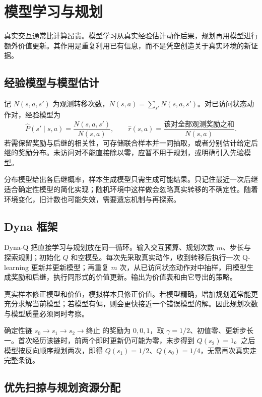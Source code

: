 \documentclass[UTF8,12pt,a4paper,fontset=fandol]{ctexbook}
\begin{document}
\chapter{模型学习与规划}
\label{ch:rl-planning}

真实交互通常比计算昂贵。模型学习从真实经验估计动作后果，规划再用模型进行额外价值更新。其作用是重复利用已有信息，而不是凭空创造关于真实环境的新证据。

\section{经验模型与模型估计}

记 $N(s,a,s')$ 为观测转移次数，$N(s,a)=\sum_{s'}N(s,a,s')$。对已访问状态动作对，经验模型为
\[
\widehat P(s'\mid s,a)=\frac{N(s,a,s')}{N(s,a)},\qquad
\widehat r(s,a)=\frac{\text{该对全部观测奖励之和}}{N(s,a)}.
\]
若需保留奖励与后继的相关性，可存储联合样本并一同抽取，或者分别估计给定后继的奖励分布。未访问对不能直接除以零，应暂不用于规划，或明确引入先验模型。

分布模型给出各后继概率，样本生成模型只需生成可能结果。只记住最近一次后继适合确定性模型的简化实现；随机环境中这样做会忽略真实转移的不确定性。随着环境变化，旧计数也可能失效，需要遗忘机制与再探索。

\section{Dyna 框架}

Dyna-Q 把直接学习与规划放在同一循环。输入交互预算、规划次数 $m$、步长与探索规则；初始化 $Q$ 和空模型。每次先采取真实动作，收到转移后执行一次 Q-learning 更新并更新模型；再重复 $m$ 次，从已访问状态动作对中抽样，用模型生成奖励和后继，执行同形式的价值更新。输出为价值表和由它导出的策略。

真实样本修正模型和价值，模拟样本只修正价值。若模型精确，增加规划通常能更充分求解当前模型；若模型有偏，则会更快接近一个错误模型的解。因此规划次数与模型质量必须同时考察。

\begin{example}[把终点奖励向前传播]
确定性链 $s_0\to s_1\to s_2\to\text{终止}$ 的奖励为 $0,0,1$，取 $\gamma=1/2$、初值零、更新步长一。首次经历该链时，前两个即时更新仍可能为零，末步得到 $Q(s_2)=1$。之后模型按反向顺序规划两次，即得 $Q(s_1)=1/2$、$Q(s_0)=1/4$，无需再次真实走完整条链。
\end{example}

\section{优先扫掠与规划资源分配}
\end{document}
